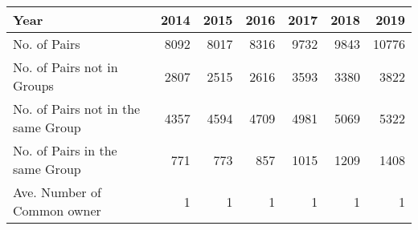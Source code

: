 \begin{tabular}{lrrrrrr}
\toprule
Year &  2014 &  2015 &  2016 &  2017 &  2018 &   2019 \\
\midrule
No. of Pairs                       &  8092 &  8017 &  8316 &  9732 &  9843 &  10776 \\
No. of Pairs not in Groups         &  2807 &  2515 &  2616 &  3593 &  3380 &   3822 \\
No. of Pairs not in the same Group &  4357 &  4594 &  4709 &  4981 &  5069 &   5322 \\
No. of Pairs in the same Group     &   771 &   773 &   857 &  1015 &  1209 &   1408 \\
Ave. Number of Common owner        &     1 &     1 &     1 &     1 &     1 &      1 \\
\bottomrule
\end{tabular}
